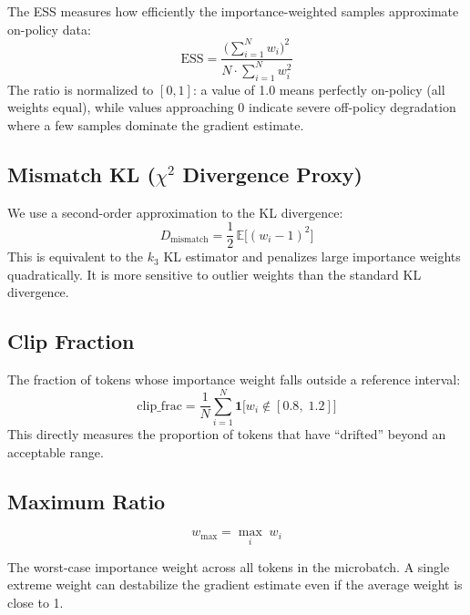 \documentclass[11pt,a4paper]{article}
\begin{document}
The ESS measures how efficiently the importance-weighted samples approximate
on-policy data:
\begin{equation}
  \mathrm{ESS} = \frac{\bigl(\sum_{i=1}^{N} w_i\bigr)^2}{N \cdot \sum_{i=1}^{N} w_i^2}
  \label{eq:ess}
\end{equation}
The ratio is normalized to $[0, 1]$: a value of 1.0 means perfectly on-policy
(all weights equal), while values approaching 0 indicate severe off-policy
degradation where a few samples dominate the gradient estimate.

\subsection{Mismatch KL ($\chi^2$ Divergence Proxy)}

We use a second-order approximation to the KL divergence:
\begin{equation}
  D_{\mathrm{mismatch}} = \frac{1}{2}\,\mathbb{E}\bigl[(w_i - 1)^2\bigr]
  \label{eq:mismatch_kl}
\end{equation}
This is equivalent to the $k_3$ KL estimator and penalizes large importance
weights quadratically. It is more sensitive to outlier weights than the standard
KL divergence.

\subsection{Clip Fraction}

The fraction of tokens whose importance weight falls outside a reference
interval:
\begin{equation}
  \mathrm{clip\_frac} = \frac{1}{N}\sum_{i=1}^{N}
    \mathbf{1}\!\bigl[w_i \notin [0.8,\; 1.2]\bigr]
  \label{eq:clip_frac}
\end{equation}
This directly measures the proportion of tokens that have ``drifted'' beyond an
acceptable range.

\subsection{Maximum Ratio}

\begin{equation}
  w_{\max} = \max_{i} \; w_i
  \label{eq:max_ratio}
\end{equation}

The worst-case importance weight across all tokens in the microbatch. A single
extreme weight can destabilize the gradient estimate even if the average weight
is close to 1.
\end{document}
